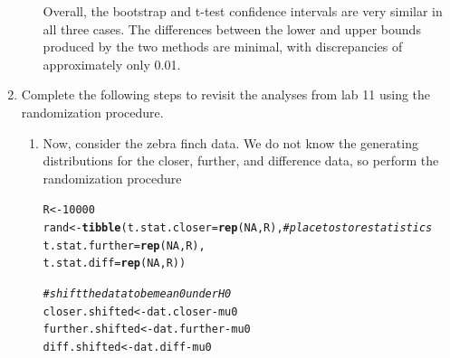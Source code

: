 \documentclass{article}\usepackage[]{graphicx}\usepackage[]{xcolor}
\makeatletter
\newcommand{\hlnum}[1]{\textcolor[rgb]{0.686,0.059,0.569}{#1}}%
\newcommand{\hlcom}[1]{\textcolor[rgb]{0.678,0.584,0.686}{\textit{#1}}}%
\newcommand{\hlopt}[1]{\textcolor[rgb]{0,0,0}{#1}}%
\newcommand{\hldef}[1]{\textcolor[rgb]{0.345,0.345,0.345}{#1}}%
\newcommand{\hlkwb}[1]{\textcolor[rgb]{0.69,0.353,0.396}{#1}}%
\newcommand{\hlkwc}[1]{\textcolor[rgb]{0.333,0.667,0.333}{#1}}%
\newcommand{\hlkwd}[1]{\textcolor[rgb]{0.737,0.353,0.396}{\textbf{#1}}}%
\newenvironment{kframe}{%
 \def\at@end@of@kframe{}%
 \ifinner\ifhmode%
  \def\at@end@of@kframe{\end{minipage}}%
  \begin{minipage}{\columnwidth}%
 \fi\fi%
 \def\FrameCommand##1{\hskip\@totalleftmargin \hskip-\fboxsep
 \colorbox{shadecolor}{##1}\hskip-\fboxsep
     \hskip-\linewidth \hskip-\@totalleftmargin \hskip\columnwidth}%
 \MakeFramed {\advance\hsize-\width
   \@totalleftmargin\z@ \linewidth\hsize
   \@setminipage}}%
 {\par\unskip\endMakeFramed%
 \at@end@of@kframe}
\newenvironment{knitrout}{}{} %
\makeatother
\begin{document}
\begin{enumerate}
\begin{enumerate}
Overall, the bootstrap and t-test confidence intervals are very similar in all three cases. The differences between the lower and upper bounds produced by the two methods are minimal, with discrepancies of approximately only 0.01.
\end{enumerate}
\item Complete the following steps to revisit the analyses from lab 11 using the
randomization procedure.
\begin{enumerate}
\item Now, consider the zebra finch data. We do not know the generating distributions
for the closer, further, and difference data, so perform the randomization procedure
\begin{knitrout}\scriptsize
{}\color{fgcolor}\begin{kframe}
\begin{alltt}
\hldef{R} \hlkwb{<-} \hlnum{10000}
\hldef{rand} \hlkwb{<-} \hlkwd{tibble}\hldef{(}\hlkwc{t.stat.closer} \hldef{=} \hlkwd{rep}\hldef{(}\hlnum{NA}\hldef{, R),} \hlcom{#place to store statistics }
               \hlkwc{t.stat.further} \hldef{=} \hlkwd{rep}\hldef{(}\hlnum{NA}\hldef{, R),}
               \hlkwc{t.stat.diff} \hldef{=} \hlkwd{rep}\hldef{(}\hlnum{NA}\hldef{, R))}

\hlcom{#shift the data to be mean 0 under H0}
\hldef{closer.shifted} \hlkwb{<-} \hldef{dat.closer} \hlopt{-} \hldef{mu0}
\hldef{further.shifted} \hlkwb{<-} \hldef{dat.further} \hlopt{-} \hldef{mu0}
\hldef{diff.shifted} \hlkwb{<-} \hldef{dat.diff} \hlopt{-} \hldef{mu0}


\end{alltt}
\end{kframe}
\end{knitrout}
\end{enumerate}
\end{enumerate}
\end{document}
